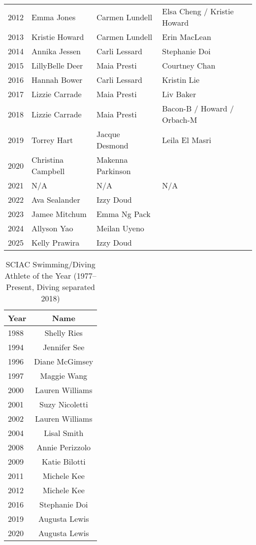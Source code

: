 \begin{table}[htbp]
\begin{tabular}{llll}
2012 & Emma Jones & Carmen Lundell & Elsa Cheng / Kristie Howard \\
2013 & Kristie Howard & Carmen Lundell & Erin MacLean \\
2014 & Annika Jessen & Carli Lessard & Stephanie Doi \\
2015 & LillyBelle Deer & Maia Presti & Courtney Chan \\
2016 & Hannah Bower & Carli Lessard & Kristin Lie \\
2017 & Lizzie Carrade & Maia Presti & Liv Baker \\
2018 & Lizzie Carrade & Maia Presti & Bacon-B / Howard / Orbach-M \\
2019 & Torrey Hart & Jacque Desmond & Leila El Masri \\
2020 & Christina Campbell & Makenna Parkinson & \\
2021 & N/A & N/A & N/A \\
2022 & Ava Sealander & Izzy Doud & \\
2023 & Jamee Mitchum & Emma Ng Pack & \\
2024 & Allyson Yao & Meilan Uyeno & \\
2025 & Kelly Prawira & Izzy Doud & \\
\bottomrule
\end{tabular}
\end{table}

\begin{table}[htbp]
\centering
\caption*{SCIAC Swimming/Diving Athlete of the Year (1977–Present, Diving separated 2018)}
\begin{tabular}{lc}
\toprule
Year & Name \\
\midrule
1988 & Shelly Ries \\
1994 & Jennifer See \\
1996 & Diane McGimsey \\
1997 & Maggie Wang \\
2000 & Lauren Williams \\
2001 & Suzy Nicoletti \\
2002 & Lauren Williams \\
2004 & Lisal Smith \\
2008 & Annie Perizzolo \\
2009 & Katie Bilotti \\
2011 & Michele Kee \\
2012 & Michele Kee \\
2016 & Stephanie Doi \\
2019 & Augusta Lewis \\
2020 & Augusta Lewis \\
\bottomrule
\end{tabular}
\end{table}

